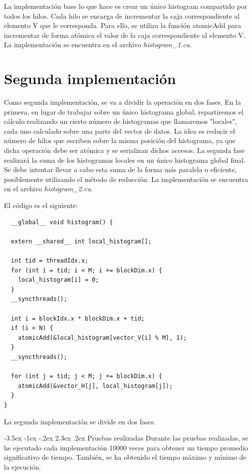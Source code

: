 \documentclass[11pt]{report}
\makeatletter
\renewcommand\chapter{\@startsection{chapter}{0}{\z@}%
    {-3.5ex \@plus -1ex \@minus -.2ex}%
    {2.3ex \@plus.2ex}%
    {\normalfont\Large\bfseries}}
\makeatother
\begin{document}
La implementación base lo que hace es crear un único histogram compartido por todos
los hilos. Cada hilo se encarga de incrementar la caja correspondiente al elemento
V que le corresponda. Para ello, se utiliza la función atomicAdd para incrementar
de forma atómica el valor de la caja correspondiente al elemento V. La implementación
se encuentra en el archivo \textit{histogram\_1.cu}.

\section{Segunda implementación}
Como segunda implementación, se va a dividir la operación en dos fases. En la primera,
en lugar de trabajar sobre un único histograma global, repartiremos el cálculo realizando 
un cierto número de histogramas que llamaremos "locales", cada uno calculado sobre una 
parte del vector de datos. La idea es reducir el número de hilos que escriben sobre la
misma posición del histograma, ya que dicha operación debe ser atómica y se serializan 
dichos accesos. La segunda fase realizará la suma de los histogramas locales en un único
histograma global final. Se debe intentar llevar a cabo esta suma de la forma más paralela
o eficiente, posiblemente utilizando el método de reducción. La implementación se encuentra
en el archivo \textit{histogram\_2.cu}.

El código es el siguiente:
\begin{lstlisting}
  __global__ void histogram() {

  extern __shared__ int local_histogram[];

  int tid = threadIdx.x;
  for (int i = tid; i < M; i += blockDim.x) {
    local_histogram[i] = 0;
  }
  __syncthreads();

  int i = blockIdx.x * blockDim.x + tid;
  if (i < N) {
    atomicAdd(&local_histogram[vector_V[i] % M], 1);
  }
  __syncthreads();

  for (int j = tid; j < M; j += blockDim.x) {
    atomicAdd(&vector_H[j], local_histogram[j]);
  }
}
\end{lstlisting}

La segunda implementación se divide en dos fases. 


\chapter{Pruebas realizadas}
Durante las pruebas realizadas, se he ejecutado cada implementación 10000 veces para 
obtener un tiempo promedio significativo de tiempo. También, se ha obtenido el tiempo
máximo y mínimo de la ejecución. 
\end{document}
